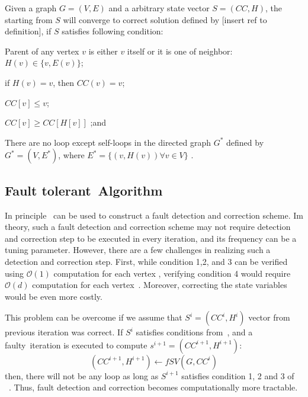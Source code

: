 \begin{thm}
\label{thm:strong-SV-converg-cond}
Given a graph $G=(V,E)$ and a arbitrary state vector $S=(CC,H)$, the~ starting from $S$ will converge to correct solution defined by [insert ref to definition], if $S$ satisfies following condition:
%
\begin{enumerate*}
\item Parent of any vertex $v$ is either $v$ itself or it is one of neighbor: $H(v) \in \{ v, E(v)\}$;

\item if $H(v)=v$, then $CC(v)=v$;

\item $CC[v]\leq v$;

\item $CC[v]\geq CC[H[v]] $ ;and

\item There are no loop except self-loops in the directed graph $G^{*}$ defined by $G^{*} = (V,E^{*})$,
 where $E^{*}=\{ (v,H(v)) \forall v \in V \}$ .
\end{enumerate*}
\end{thm}

\subsection{Fault tolerant~\sv Algorithm}
In principle~ can be used to construct a fault detection and correction scheme. 
Im theory,  such a fault detection and correction scheme may not require detection and correction 
step to be executed in every iteration, and its frequency can be a tuning parameter. 
However, there are a few challenges in realizing such a detection and correction step. 
First, while condition 1,2, and 3 can be verified using $\mathcal{O}(1)$ computation for each vertex , verifying
condition 4 would require $\mathcal{O}(d)$ computation for each vertex~\cite{brent1980cycle}. 
Moreover, correcting the state variables would be even more costly. 

This problem can be overcome if we assume that $S^{i}=(CC^{i},H^{i})$ vector from previous iteration was correct.
If $S^{i}$ satisfies conditions from~, and a faulty~\sv iteration
is executed to compute $s^{i+1} = (CC^{i+1},H^{i+1})$:
\[
(CC^{i+1},H^{i+1}) \leftarrow fSV (G,CC^{i}) 
\] 
then, there will not be any loop as long as $S^{i+1}$ satisfies condition 1, 2 and 3 of ~. Thus, fault detection and correction becomes computationally more tractable.


